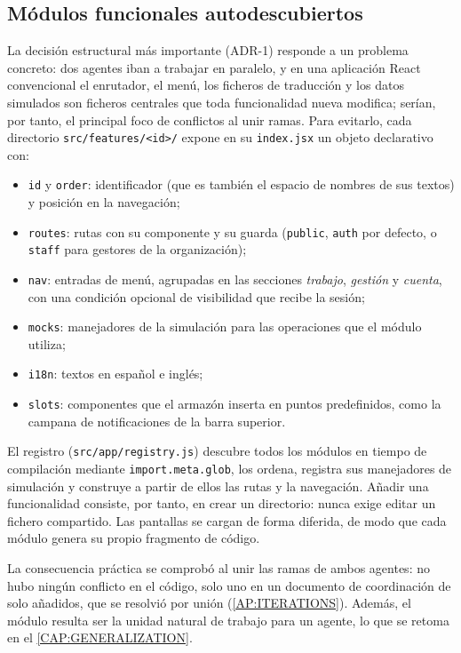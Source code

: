 \subsection{Módulos funcionales autodescubiertos}

La decisión estructural más importante (ADR-1) responde a un problema concreto: dos
agentes iban a trabajar en paralelo, y en una aplicación React convencional el enrutador,
el menú, los ficheros de traducción y los datos simulados son ficheros centrales que toda
funcionalidad nueva modifica; serían, por tanto, el principal foco de conflictos al unir
ramas. Para evitarlo, cada directorio \texttt{src/features/<id>/} expone en su
\texttt{index.jsx} un objeto declarativo con:
\begin{itemize}
  \item \texttt{id} y \texttt{order}: identificador (que es también el espacio de nombres
        de sus textos) y posición en la navegación;
  \item \texttt{routes}: rutas con su componente y su guarda (\texttt{public},
        \texttt{auth} por defecto, o \texttt{staff} para gestores de la organización);
  \item \texttt{nav}: entradas de menú, agrupadas en las secciones \emph{trabajo},
        \emph{gestión} y \emph{cuenta}, con una condición opcional de visibilidad que
        recibe la sesión;
  \item \texttt{mocks}: manejadores de la simulación para las operaciones que el módulo
        utiliza;
  \item \texttt{i18n}: textos en español e inglés;
  \item \texttt{slots}: componentes que el armazón inserta en puntos predefinidos, como
        la campana de notificaciones de la barra superior.
\end{itemize}
El registro (\texttt{src/app/registry.js}) descubre todos los módulos en tiempo de
compilación mediante \texttt{import.meta.glob}, los ordena, registra sus manejadores de
simulación y construye a partir de ellos las rutas y la navegación. Añadir una
funcionalidad consiste, por tanto, en crear un directorio: nunca exige editar un fichero
compartido. Las pantallas se cargan de forma diferida, de modo que cada módulo genera su
propio fragmento de código.

La consecuencia práctica se comprobó al unir las ramas de ambos agentes: no hubo ningún
conflicto en el código, solo uno en un documento de coordinación de solo añadidos, que se
resolvió por unión (\cref{AP:ITERATIONS}). Además, el módulo resulta ser la unidad natural
de trabajo para un agente, lo que se retoma en el \cref{CAP:GENERALIZATION}.


